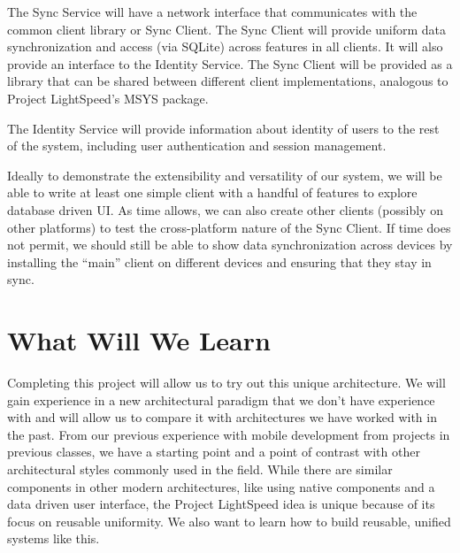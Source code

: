 \documentclass[12pt]{article}
\begin{document}
    The Sync Service will have a network interface that communicates with the common client library or Sync Client.
    The Sync Client will provide uniform data synchronization and access (via SQLite) across features in all clients.
    It will also provide an interface to the Identity Service.
        The Sync Client will be provided as a library that can be shared between different client implementations, analogous to Project LightSpeed's MSYS package.

    The Identity Service will provide information about identity of users to the rest of the system, including user authentication and session management.

    Ideally to demonstrate the extensibility and versatility of our system, we will be able to write at least one simple client with a handful of features to explore database driven UI.
    As time allows, we can also create other clients (possibly on other platforms) to test the cross-platform nature of the Sync Client.
    If time does not permit, we should still be able to show data synchronization across devices by installing the “main” client on different devices and ensuring that they stay in sync.


    \section{What Will We Learn}
    Completing this project will allow us to try out this unique architecture.
    We will gain experience in a new architectural paradigm that we don’t have experience with and will allow us to compare it with architectures we have worked with in the past.
    From our previous experience with mobile development from projects in previous classes, we have a starting point and a point of contrast with other architectural styles commonly used in the field.
    While there are similar components in other modern architectures, like using native components and a data driven user interface, the Project LightSpeed idea is unique because of its focus on reusable uniformity.
    We also want to learn how to build reusable, unified systems like this.
\end{document}
